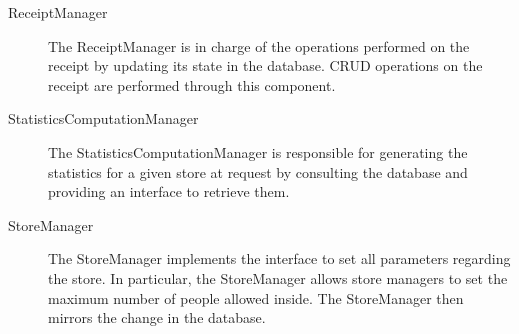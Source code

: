 \documentclass[../../main.tex]{subfiles}
\begin{document}
\begin{description}
    \item[ReceiptManager] The ReceiptManager is in charge of the operations performed on the receipt by updating its 
    state in the database. CRUD operations on the receipt are performed through this component.
    
    \item[StatisticsComputationManager]  The StatisticsComputationManager is responsible for 
    generating the statistics for a given store at request by consulting the database and providing an interface to retrieve them.	  
     
    \item[StoreManager] The StoreManager implements the interface to set all parameters regarding the store. 
    In particular, the StoreManager allows store managers to set the maximum number of people allowed inside. 
    The StoreManager then mirrors the change in the database.
    
\end{description}
\end{document}
